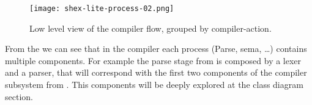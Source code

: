 \begin{figure*}[h]
    \texttt{[image: shex-lite-process-02.png]}
    \caption[Low level view of the compiler flow, grouped by compiler-action]{Low level view of the compiler flow, grouped by compiler-action.}
\end{figure*}

From the  we can see that in the compiler each process (Parse, sema, …)
contains multiple components. For example the parse stage from  is composed
by a lexer and a parser, that will correspond with the first two components of the compiler
subsystem from . This components will be deeply explored at the class diagram
section. 